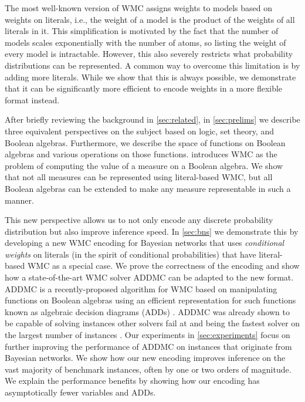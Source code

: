 \documentclass{uai2021} %
\theoremstyle{definition}
\begin{document}
The most well-known version of WMC assigns weights to models based on
weights on literals, i.e., the weight of a model is the product of the weights
of all literals in it. This simplification is motivated by the fact that the
number of models scales exponentially with the number of atoms, so listing the
weight of every model is intractable. However, this also severely restricts what
probability distributions can be represented. A common way to overcome this
limitation is by adding more literals. While we show that this is always
possible, we demonstrate that it can be significantly more efficient to
encode weights in a more flexible format instead.

After briefly reviewing the background in \cref{sec:related}, in
\cref{sec:prelims} we  describe three equivalent perspectives on the subject
based on logic, set theory, and Boolean algebras. Furthermore, we describe the
space of functions on Boolean algebras and various operations on those
functions.  introduces WMC as the problem of computing
the value of a measure on a Boolean algebra. We show that not all measures can
be represented using literal-based WMC, but all Boolean algebras can be extended
to make any measure representable in such a manner.

This new perspective allows us to not only encode any discrete probability
distribution but also improve inference speed. In \cref{sec:bns} we demonstrate
this by developing a new WMC encoding for Bayesian networks that uses
\emph{conditional weights} on literals (in the spirit of conditional
probabilities) that have literal-based WMC as a special case. We prove the
correctness of the encoding and show how a state-of-the-art WMC solver
\textsf{ADDMC} \citep{DBLP:conf/aaai/DudekPV20} can be adapted to the new
format. \textsf{ADDMC} is a recently-proposed algorithm for WMC based on
manipulating functions on Boolean algebras using an efficient representation for
such functions known as algebraic decision diagrams (ADDs)
\citep{DBLP:journals/fmsd/BaharFGHMPS97}. \textsf{ADDMC} was already shown to be
capable of solving instances other solvers fail at and being the fastest solver
on the largest number of instances \citep{DBLP:conf/aaai/DudekPV20}. Our
experiments in \cref{sec:experiments} focus on further improving the performance
of \textsf{ADDMC} on instances that originate from Bayesian networks. We show
how our new encoding improves inference on the vast majority of benchmark
instances, often by one or two orders of magnitude. We explain the performance
benefits by showing how our encoding has asymptotically fewer variables and
ADDs.
\end{document}
